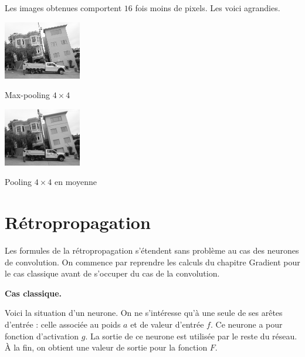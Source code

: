 \documentclass[11pt,class=report,crop=false]{standalone}
\begin{document}
Les images obtenues comportent $16$ fois moins de pixels. Les voici agrandies.

\begin{center}
	\begin{minipage}{0.45\textwidth}\center
	 \includegraphics[scale=\myscale,scale=1.6]{figures/image_pooling_max}
	
	Max-pooling $4\times 4$
    \end{minipage}
	\begin{minipage}{0.45\textwidth}\center
	 \includegraphics[scale=\myscale,scale=1.6]{figures/image_pooling_average}
	
	Pooling $4\times 4$ en moyenne
    \end{minipage}    
\end{center}

\section{Rétropropagation}


Les formules de la rétropropagation s'étendent sans problème au cas des neurones de convolution.
On commence par reprendre les calculs du chapitre \og{}Gradient\fg{} pour le cas classique avant de s'occuper du cas de la convolution.

\textbf{Cas classique.}

Voici la situation d'un neurone. On ne s'intéresse qu'à une seule de ses arêtes d'entrée : celle associée au poids $a$ et de valeur d'entrée $f$. 
Ce neurone a pour fonction d'activation $g$. La sortie de ce neurone est utilisée par le reste du réseau. À la fin, on obtient une valeur de sortie pour la fonction $F$.

\end{document}
